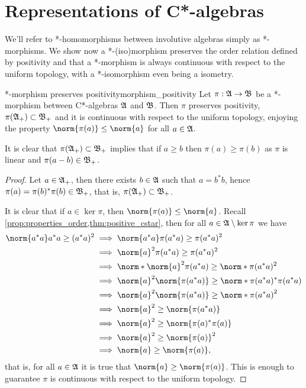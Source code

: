 \section{Representations of C*-algebras}
We'll refer to *-homomorphisms between involutive algebras simply as *-morphisms. We show now a *-(iso)morphism preserves the order relation defined by positivity and that a *-morphism is always continuous with respect to the uniform topology, with a *-isomorphism even being a isometry.
\begin{proposition}{*-morphism preserves positivity}{morphism_positivity}
    Let \(\pi : \mathfrak{A} \to \mathfrak{B}\) be a *-morphism between C*-algebras \(\mathfrak{A}\) and \(\mathfrak{B}\). Then \(\pi\) preserves positivity, \(\pi(\mathfrak{A}_+)\subset \mathfrak{B}_+\) and it is continuous with respect to the uniform topology, enjoying the property \(\norm{\pi(a)} \leq \norm{a}\) for all \(a \in \mathfrak{A}\).
\end{proposition}
\begin{remark}
    It is clear that \(\pi(\mathfrak{A}_+) \subset \mathfrak{B}_+\) implies that if \(a \geq b\) then \(\pi(a) \geq \pi(b)\) as \(\pi\) is linear and \(\pi(a-b) \in \mathfrak{B}_+\).
\end{remark}
\begin{proof}
    Let \(a \in \mathfrak{A}_+\), then there exists \(b \in \mathfrak{A}\) such that \(a = b^*b\), hence \(\pi(a) = \pi(b)^* \pi(b) \in \mathfrak{B}_+\), that is, \(\pi(\mathfrak{A}_+)\subset \mathfrak{B}_+\).

    It is clear that if \(a \in \ker\pi\), then \(\norm{\pi(a)} \leq \norm{a}\). Recall \cref{prop:properties_order,thm:positive_cstar}, then for all \(a \in \mathfrak{A}\setminus\ker{\pi}\) we have
    \begin{align*}
        \norm{a^*a} a^*a \geq (a^*a)^2 &\implies \norm{a^*a} \pi(a^*a) \geq \pi(a^*a)^2\\
                                       &\implies \norm{a}^2 \pi(a^*a) \geq \pi(a^*a)^2\\
                                       &\implies \norm*{\norm{a}^2 \pi(a^*a)} \geq \norm*{\pi(a^*a)^2}\\
                                       &\implies \norm{a}^2 \norm{\pi(a^*a)} \geq \norm*{\pi(a^*a)^* \pi(a^*a)}\\
                                       &\implies \norm{a}^2 \norm{\pi(a^*a)} \geq \norm*{\pi(a^*a)}^2\\
                                       &\implies \norm{a}^2 \geq \norm{\pi(a^*a)}\\
                                       &\implies \norm{a}^2 \geq \norm{\pi(a)^* \pi(a)}\\
                                       &\implies \norm{a}^2 \geq \norm{\pi(a)}^2\\
                                       &\implies \norm{a} \geq \norm{\pi(a)},
    \end{align*}
    that is, for all \(a \in \mathfrak{A}\) it is true that \(\norm{a} \geq \norm{\pi(a)}\). This is enough to guarantee \(\pi\) is continuous with respect to the uniform topology.
\end{proof}

